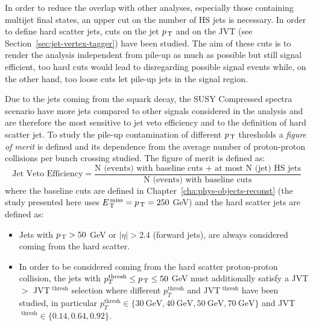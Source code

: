 In order to reduce the overlap with other analyses, especially those containing
multijet final states, an upper cut on the number of HS jets is necessary. In
order to define hard scatter jets, cuts on the jet $p_\mathrm{\, T}$ and on the JVT (see
Section~\ref{sec:jet-vertex-tagger}) have been studied. The aim of these cuts is
to render the analysis independent from pile-up as much as possible but still
signal efficient, too hard cuts would lead to disregarding possible signal
events while, on the other hand, too loose cuts let pile-up jets in the signal
region.

Due to the jets coming from the squark decay, the SUSY Compressed spectra
scenario have more jets compared to other signals considered in the analysis and
are therefore the most sensitive to jet veto efficiency and to the definition of
hard scatter jet. To study the pile-up contamination of different $p_\mathrm{\, T}$
thresholds a \emph{figure of merit} is defined and its dependence from the
average number of proton-proton collisions per bunch crossing studied. The
figure of merit is defined as:
\begin{equation}
  \label{eq:fig_merit}
  \text{Jet Veto Efficiency} = \frac{\text{N (events) with baseline cuts + at
      most N (jet) HS jets}}{\text{N (events)
      with baseline cuts}}
\end{equation}
where the baseline cuts are defined in Chapter~\ref{cha:phys-objects-reconst}
(the study presented here uses $E_\mathrm{\, T}^\mathrm{\, miss} = p_\mathrm{\, T} = 250$ GeV) and the hard scatter jets
are defined as:
\begin{itemize}
\item Jets with $p_\mathrm{\, T} > 50$ GeV or $|\eta| > 2.4$ (forward jets), are always
  considered coming from the hard scatter.
\item In order to be considered coming from the hard scatter proton-proton
  collision, the jets with $p_T^{\text{thresh}} \leq p_\mathrm{\, T} \leq 50$ GeV must
  additionally satisfy a JVT $>$ JVT$^{\text{ thresh}}$ selection where
  different $p_T^{\text{thresh}}$ and JVT$^{\text{ thresh}}$ have been studied,
  in particular
  $p_T^{\text{thresh}} \in \{30~\text{GeV}, 40~\text{GeV}, 50~\text{GeV},
  70~\text{GeV}\}$ and JVT$^{\text{ thresh}} \in \{0.14, 0.64, 0.92\}$.
\end{itemize}

